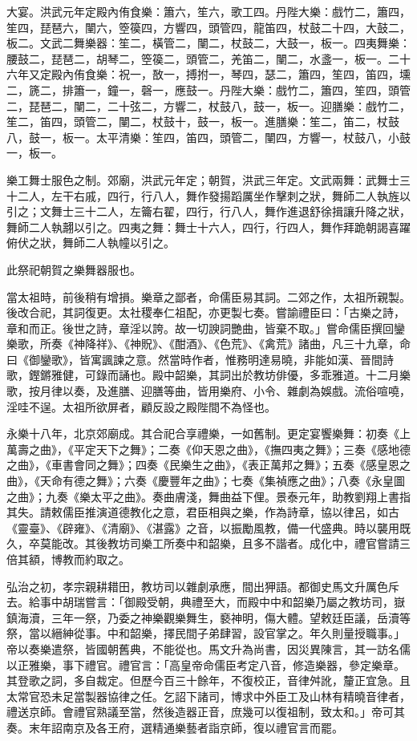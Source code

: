 大宴。洪武元年定殿內侑食樂：簫六，笙六，歌工四。丹陛大樂：戲竹二，簫四，笙四，琵琶六，闉六，箜篌四，方響四，頭管四，龍笛四，杖鼓二十四，大鼓二，板二。文武二舞樂器：笙二，橫管二，闉二，杖鼓二，大鼓一，板一。四夷舞樂：腰鼓二，琵琶二，胡琴二，箜篌二，頭管二，羌笛二，闉二，水盞一，板一。二十六年又定殿內侑食樂：祝一，敔一，搏拊一，琴四，瑟二，簫四，笙四，笛四，壎二，篪二，排簫一，鐘一，磬一，應鼓一。丹陛大樂：戲竹二，簫四，笙四，頭管二，琵琶二，闉二，二十弦二，方響二，杖鼓八，鼓一，板一。迎膳樂：戲竹二，笙二，笛四，頭管二，闉二，杖鼓十，鼓一，板一。進膳樂：笙二，笛二，杖鼓八，鼓一，板一。太平清樂：笙四，笛四，頭管二，闉四，方響一，杖鼓八，小鼓一，板一。

樂工舞士服色之制。郊廟，洪武元年定；朝賀，洪武三年定。文武兩舞：武舞士三十二人，左干右戚，四行，行八人，舞作發揚蹈厲坐作擊刺之狀，舞師二人執旌以引之；文舞士三十二人，左籥右翟，四行，行八人，舞作進退舒徐揖讓升降之狀，舞師二人執翿以引之。四夷之舞：舞士十六人，四行，行四人，舞作拜跪朝謁喜躍俯伏之狀，舞師二人執幢以引之。

此祭祀朝賀之樂舞器服也。

當太祖時，前後稍有增損。樂章之鄙者，命儒臣易其詞。二郊之作，太祖所親製。後改合祀，其詞復更。太社稷奉仁祖配，亦更製七奏。嘗諭禮臣曰：「古樂之詩，章和而正。後世之詩，章淫以誇。故一切諛詞艷曲，皆棄不取。」嘗命儒臣撰回鑾樂歌，所奏《神降祥》、《神貺》、《酣酒》、《色荒》、《禽荒》諸曲，凡三十九章，命曰《御鑾歌》，皆寓諷諫之意。然當時作者，惟務明達易曉，非能如漢、晉間詩歌，鏗鏘雅健，可錄而誦也。殿中韶樂，其詞出於教坊俳優，多乖雅道。十二月樂歌，按月律以奏，及進膳、迎膳等曲，皆用樂府、小令、雜劇為娛戲。流俗喧嘵，淫哇不逞。太祖所欲屏者，顧反設之殿陛間不為怪也。

永樂十八年，北京郊廟成。其合祀合享禮樂，一如舊制。更定宴饗樂舞：初奏《上萬壽之曲》，《平定天下之舞》；二奏《仰天恩之曲》，《撫四夷之舞》；三奏《感地德之曲》，《車書會同之舞》；四奏《民樂生之曲》，《表正萬邦之舞》；五奏《感皇恩之曲》，《天命有德之舞》；六奏《慶豐年之曲》；七奏《集禎應之曲》；八奏《永皇圖之曲》；九奏《樂太平之曲》。奏曲膚淺，舞曲益下俚。景泰元年，助教劉翔上書指其失。請敕儒臣推演道德教化之意，君臣相與之樂，作為詩章，協以律呂，如古《靈臺》、《辟雍》、《清廟》、《湛露》之音，以振勵風教，備一代盛典。時以襲用既久，卒莫能改。其後教坊司樂工所奏中和韶樂，且多不諧者。成化中，禮官嘗請三倍其額，博教而約取之。

弘治之初，孝宗親耕耤田，教坊司以雜劇承應，間出狎語。都御史馬文升厲色斥去。給事中胡瑞嘗言：「御殿受朝，典禮至大，而殿中中和韶樂乃屬之教坊司，嶽鎮海瀆，三年一祭，乃委之神樂觀樂舞生，褻神明，傷大體。望敕廷臣議，岳瀆等祭，當以縉紳從事。中和韶樂，擇民間子弟肆習，設官掌之。年久則量授職事。」帝以奏樂遣祭，皆國朝舊典，不能從也。馬文升為尚書，因災異陳言，其一訪名儒以正雅樂，事下禮官。禮官言：「高皇帝命儒臣考定八音，修造樂器，參定樂章。其登歌之詞，多自裁定。但歷今百三十餘年，不復校正，音律舛訛，釐正宜急。且太常官恐未足當製器協律之任。乞詔下諸司，博求中外臣工及山林有精曉音律者，禮送京師。會禮官熟議至當，然後造器正音，庶幾可以復祖制，致太和。」帝可其奏。末年詔南京及各王府，選精通樂藝者詣京師，復以禮官言而罷。

